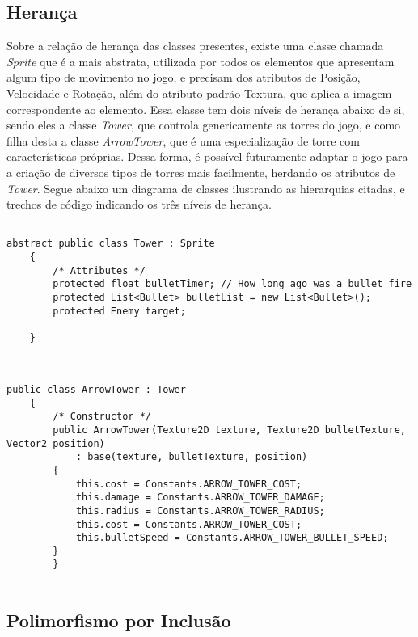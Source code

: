 \documentclass[rel_mlp]{iiufrgs}
\begin{document}
\subsection{Herança}

Sobre a relação de herança das classes presentes, existe uma classe chamada \textit{Sprite} que é a mais abstrata, utilizada por todos os elementos que apresentam algum tipo de movimento no jogo, e precisam dos atributos de Posição, Velocidade e Rotação, além do atributo padrão Textura, que aplica a imagem correspondente ao elemento. Essa classe tem dois níveis de herança abaixo de si, sendo eles a classe \textit{Tower}, que controla genericamente as torres do jogo, e como filha desta a classe \textit{ArrowTower}, que é uma especialização de torre com características próprias. Dessa forma, é possível futuramente adaptar o jogo para a criação de diversos tipos de torres mais facilmente, herdando os atributos de \textit{Tower}. Segue abaixo um diagrama de classes ilustrando as hierarquias citadas, e trechos de código indicando os três níveis de herança.

\begin{lstlisting}[caption=Trecho de código C\# retirado da implementação deste trabalho, label=lst:test]

abstract public class Tower : Sprite
	{
		/* Attributes */
        protected float bulletTimer; // How long ago was a bullet fire
		protected List<Bullet> bulletList = new List<Bullet>();
        protected Enemy target;

	}
	
\end{lstlisting}
	
\begin{lstlisting}[caption=Trecho de código C\# retirado da implementação deste trabalho, label=lst:test]

public class ArrowTower : Tower
	{
		/* Constructor */
        public ArrowTower(Texture2D texture, Texture2D bulletTexture, Vector2 position)
            : base(texture, bulletTexture, position)
        {
            this.cost = Constants.ARROW_TOWER_COST;
            this.damage = Constants.ARROW_TOWER_DAMAGE;
            this.radius = Constants.ARROW_TOWER_RADIUS;
			this.cost = Constants.ARROW_TOWER_COST;
			this.bulletSpeed = Constants.ARROW_TOWER_BULLET_SPEED;
        }
		}


\end{lstlisting}

\subsection{Polimorfismo por Inclusão}
\end{document}
